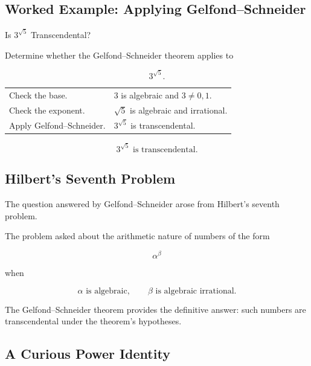 \subsection{Worked Example: Applying Gelfond--Schneider}
\label{subsec:worked-gelfond-schneider}

\begin{workedexamplebox}{Is \(3^{\sqrt5}\) Transcendental?}

Determine whether the Gelfond--Schneider theorem applies to

\[ 3^{\sqrt5}. \]

\begin{tabularx}{\textwidth}{@{}>{\raggedright\arraybackslash}p{}X@{}}
Check the base. & \(3\) is algebraic and \(3\neq0,1\).\\
Check the exponent. & \(\sqrt5\) is algebraic and irrational.\\
Apply Gelfond--Schneider. & \(3^{\sqrt5}\) is transcendental.
\end{tabularx}

\begin{answerbox}
\[ \boxed{3^{\sqrt5}\text{ is transcendental}.} \]
\end{answerbox}
\end{workedexamplebox}

\subsection{Hilbert's Seventh Problem}
\label{subsec:hilbert-seventh-problem}

The question answered by Gelfond--Schneider arose from Hilbert's seventh
problem.

The problem asked about the arithmetic nature of numbers of the form

\[ \alpha^\beta \]

when

\[
\alpha\text{ is algebraic},\qquad
\beta\text{ is algebraic irrational}.
\]

The Gelfond--Schneider theorem provides the definitive answer:
such numbers are transcendental under the theorem's hypotheses.

\subsection{A Curious Power Identity}
\label{subsec:irrational-power-rational}


